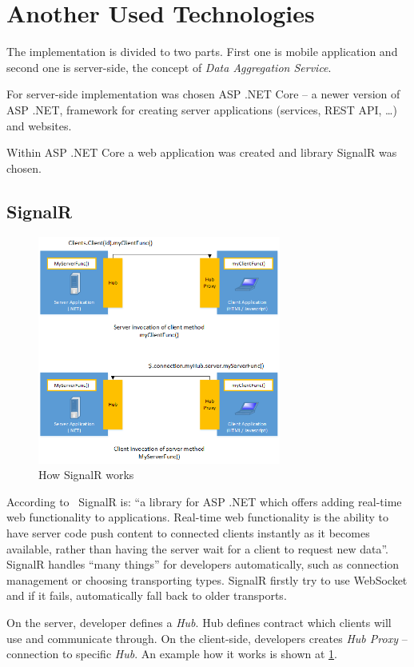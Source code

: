 \section{Another Used Technologies}
The implementation is divided to two parts. First one is mobile application and second one is server-side, the concept of \textit{Data Aggregation Service}. 

For server-side implementation was chosen ASP .NET Core -- a newer version of ASP .NET, framework for creating server applications  (services, REST API, \dots) and websites.

Within ASP .NET Core a web application was created and library SignalR was chosen.
\subsection{SignalR}
\begin{figure}[ht!]
\centering
\includegraphics[width=8cm,keepaspectratio]{img/signal-r-overview}
\caption{How SignalR works \cite{signal-r-overview}}
\label{fig:signal-r-overview}
\end{figure}
According to~\cite{signal-r-overview} SignalR is: ``a library for ASP .NET which offers adding real-time web functionality to applications. Real-time web functionality is the ability to have server code push content to connected clients instantly as it becomes available, rather than having the server wait for a client to request new data''. SignalR handles ``many things'' for developers automatically, such as connection management or choosing transporting types. SignalR firstly try to use WebSocket and if it fails, automatically fall back to older transports.

On the server, developer defines a \textit{Hub}. Hub defines contract which clients will use and communicate through. On the client-side, developers creates \textit{Hub Proxy} -- connection to specific \textit{Hub}. An example how it works is shown at \cref{fig:signal-r-overview}.
